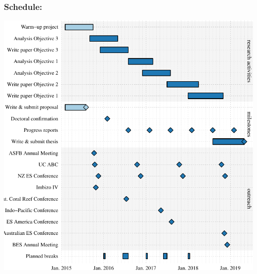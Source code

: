 \documentclass[a4paper]{article}
\begin{document}
\subsubsection*{Schedule:}
\includegraphics{schedule}
 
\printbibliography
\end{document}

